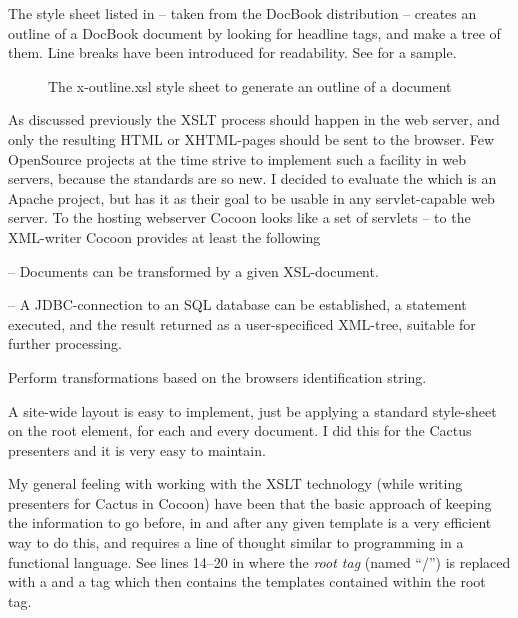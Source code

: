 The style sheet listed in  -- taken from
the DocBook distribution -- creates an outline of a DocBook document
by looking for headline tags, and make a tree of them. Line breaks
have been introduced for readability.  See
 for a sample.

\begin{figure}[tbp]
  \begin{center}
\small
{}    
    \caption{The x-outline.xsl style sheet to generate an outline of a document}
    \label{fig:listing-x-outline.xsl}
  \end{center}
\end{figure}

As discussed previously the XSLT process should happen in the web
server, and only the resulting HTML or XHTML-pages should be sent to
the browser.  Few OpenSource projects at the time strive to implement
such a facility in web servers, because the standards are so new.  I
decided to evaluate the
 which
is an Apache project, but has it as their goal to be usable in any
servlet-capable web server.  To the hosting webserver Cocoon looks
like a set of servlets -- to the XML-writer Cocoon provides at least
the following

\begin{description}
\item[XSLT] -- Documents can be transformed by a given XSL-document.
  
\item[SQLProcessor] -- A JDBC-connection to an SQL database can be
  established, a statement executed, and the result returned as a
  user-specificed XML-tree, suitable for further processing.
  
\item Perform transformations based on the browsers identification
  string.
\end{description}

A site-wide layout is easy to implement, just be applying a standard
style-sheet on the root element, for each and every document.  I did
this for the Cactus presenters and it is very easy to maintain.

My general feeling with working with the XSLT technology (while
writing presenters for Cactus in Cocoon) have been that the basic
approach of keeping the information to go before, in and after any
given template is a very efficient way to do this, and requires a line
of thought similar to programming in a functional language.  See lines
14--20 in  where the \textit{root
tag} (named ``/'') is replaced with a  and a  tag
which then contains the templates contained within the root tag.

